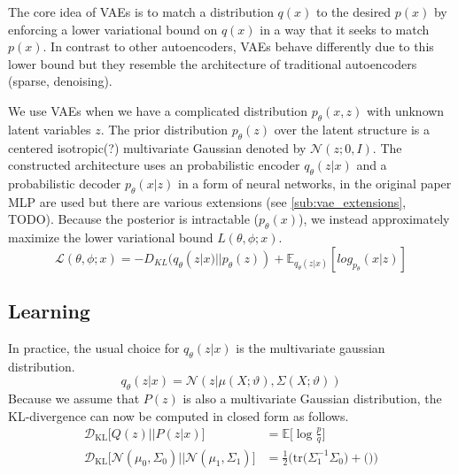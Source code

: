 The core idea of VAEs is to match a distribution $q(x)$ to the desired $p(x)$ by enforcing a lower variational bound on $q(x)$ in a way that it seeks to match $p(x)$.
In contrast to other autoencoders, VAEs behave differently due to this lower bound but they resemble the architecture of traditional autoencoders (sparse, denoising).




We use VAEs when we have a complicated distribution $p_\theta(x,z)$ with unknown latent variables $z$.
The prior distribution $p_\theta(z)$ over the latent structure is a centered isotropic(?) multivariate Gaussian denoted by $\mathcal{N}(z;0, I)$.
The constructed architecture uses an probabilistic encoder $q_\theta(z|x)$ and a probabilistic decoder $p_\theta(x|z)$ in a form of neural networks, in the original paper MLP are used\cite{vae:2013} but there are various extensions (see \ref{sub:vae_extensions}, TODO).
Because the posterior is intractable ($p_\theta(x)$), we instead approximately maximize the lower variational bound $L(\theta,\phi;x)$.\\
\begin{equation}
  \mathcal{L}(\theta,\phi;x) = -D_{KL}(q_\theta(z|x)||p_\theta(z)) + \mathbb{E}_{q_\theta(z|x)}[log_{p_\theta}(x|z)]
\end{equation}




\subsection{Learning}
\label{sub:vae_learning}
In practice, the usual choice for $q_\theta(z|x)$ is the multivariate gaussian distribution.
$$
q_\theta(z|x) = \mathcal{N}(z|\mu(X;\vartheta), \Sigma(X;\vartheta))
$$
Because we assume that $P(z)$ is also a multivariate Gaussian distribution, the KL-divergence can now be computed in closed form as follows\cite{derivations:2007}.
\begin{align*}
  \mathcal{D}_{\mathrm{KL}}\big[Q(z) || P(z|x)\big] &= \mathbb{E}\big[\log \frac{p}{q}\big]\\
  \mathcal{D}_{\mathrm{KL}}\big[\mathcal{N}(\mu_0,\Sigma_0) || \mathcal{N}(\mu_1,\Sigma_1)\big]
  &= \frac{1}{2} \big(\mathrm{tr}\big(\Sigma_1^{-1}\Sigma_0\big) + \big(\big)\big)
\end{align*}


